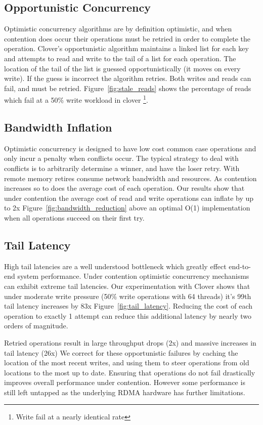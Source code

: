 \subsection{Opportunistic Concurrency} 
Optimistic concurrency algorithms are by
definition optimistic, and when contention does occur their operations must be
retried in order to complete the operation. Clover's opportunistic algorithm
maintains a linked list for each key and attempts to read and write to the tail
of a list for each operation. The location of the tail of the list is guessed
opportunistically (it moves on every write). If the guess is incorrect the
algorithm retries. Both writes and reads can fail, and must be retried.
Figure~\ref{fig:stale_reads} shows the percentage of reads which fail at a 50\%
write workload in clover \footnote{Write fail at a nearly identical rate}.

\subsection{Bandwidth Inflation} 

Optimistic concurrency is designed to have low cost common case operations and
only incur a penalty when conflicts occur. The typical strategy to deal with
conflicts is to arbitrarily determine a winner, and have the loser retry. With
remote memory retires consume network bandwidth and resources. As contention
increases so to does the average cost of each operation. Our results show that
under contention the average cost of read and write operations can inflate by up
to 2x Figure~\ref{fig:bandwidth_reduction} above an optimal O(1) implementation when
all operations succeed on their first try.

\subsection{Tail Latency}

High tail latencies are a well understood bottleneck which greatly effect
end-to-end system performance. Under contention optimistic concurrency
mechanisms can exhibit extreme tail latencies. Our experimentation with Clover
shows that under moderate write pressure (50\% write operations with 64 threads)
it's 99th tail latency increases by 83x Figure~\ref{fig:tail_latency}. Reducing the
cost of each operation to exactly 1 attempt can reduce this additional latency
by nearly two orders of magnitude.

Retried operations result in large throughput drops (2x) and massive increases
in tail latency (26x) We correct for these opportunistic failures by caching the
location of the most recent writes, and using them to steer operations from old
locations to the most up to date. Ensuring that operations do not fail
drastically improves overall performance under contention. However some
performance is still left untapped as the underlying RDMA hardware has further
limitations. 


